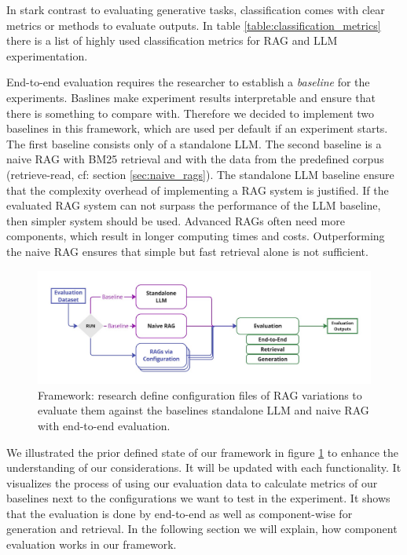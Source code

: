 In stark contrast to evaluating generative tasks, classification comes with clear metrics or methods to evaluate outputs. In table \ref{table:classification_metrics} there is a list of highly used classification metrics for RAG and LLM experimentation.\cite{Hou.8212023,Zeng.28.03.2024} 

End-to-end evaluation requires the researcher to establish a \textit{baseline} for the experiments. Baslines make experiment results interpretable and ensure that there is something to compare with. Therefore we decided to implement two baselines in this framework, which are used per default if an experiment starts. The first baseline consists only of a standalone LLM. The second baseline is a naive RAG with BM25 retrieval and with the data from the predefined corpus (retrieve-read, cf: section \ref{sec:naive_rags}). The standalone LLM baseline ensure that the complexity overhead of implementing a RAG system is justified. If the evaluated RAG system can not surpass the performance of the LLM baseline, then simpler system should be used. Advanced RAGs often need more components, which result in longer computing times and costs. Outperforming the naive RAG ensures that simple but fast retrieval alone is not sufficient. 

\begin{figure}[h]
  \centering
  \includegraphics[width=\textwidth]{images/FrameworkBaselines.pdf}
  \caption{Framework: research define configuration files of RAG variations to evaluate them against the baselines standalone LLM and naive RAG with end-to-end evaluation.}
  \label{fig:framework-baselines}
\end{figure}

We illustrated the prior defined state of our framework in figure \ref{fig:framework-baselines} to enhance the understanding of our considerations. It will be updated with each functionality. It visualizes the process of using our evaluation data to calculate metrics of our baselines next to the configurations we want to test in the experiment. It shows that the evaluation is done by end-to-end as well as component-wise for generation and retrieval. In the following section we will explain, how component evaluation works in our framework.


